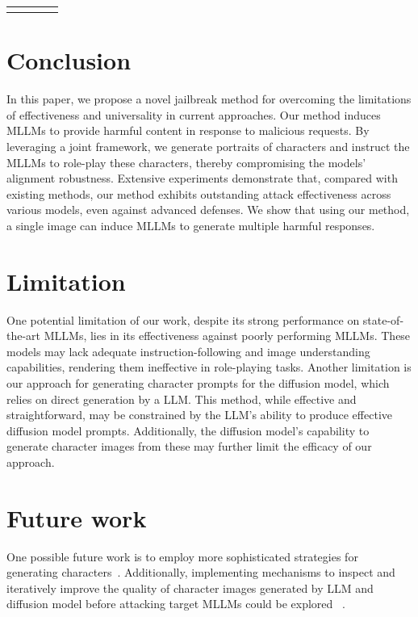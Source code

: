\begin{table}[ht]
{\begin{threeparttable}
\begin{tabular}{cccc}
    \bottomrule\\
  \end{tabular}
  \end{threeparttable}
  \label{tab:model-performance-settings}
  }
\end{table}

\section{Conclusion}
In this paper, we propose a novel jailbreak method for overcoming the limitations of effectiveness and universality in current approaches. Our method induces MLLMs to provide harmful content in response to malicious requests. By leveraging a joint framework, we generate portraits of characters and instruct the MLLMs to role-play these characters, thereby compromising the models' alignment robustness. Extensive experiments demonstrate that, compared with existing methods, our method exhibits outstanding attack effectiveness across various models, even against advanced defenses. We show that using our method, a single image can induce MLLMs to generate multiple harmful responses. 

\section{Limitation}
One potential limitation of our work, despite its strong performance on state-of-the-art MLLMs, lies in its effectiveness against poorly performing MLLMs. These models may lack adequate instruction-following and image understanding capabilities, rendering them ineffective in role-playing tasks. Another limitation is our approach for generating character prompts for the diffusion model, which relies on direct generation by a LLM. This method, while effective and straightforward, may be constrained by the LLM's ability to produce effective diffusion model prompts. Additionally, the diffusion model's capability to generate character images from these may further limit the efficacy of our approach.

\section{Future work}

One possible future work is to employ more sophisticated strategies for generating characters~\cite{zeng2024johnny,chao2023jailbreaking}. Additionally, implementing mechanisms to inspect and iteratively improve the quality of character images generated by LLM and diffusion model before attacking target MLLMs could be explored ~\cite{li2024images,shinn2023reflexion}.

